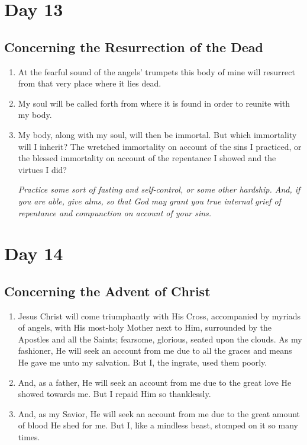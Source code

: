 \documentclass[11pt]{article}
\begin{document}
\section{Day 13}
\label{sec:org0da3211}
\subsection{Concerning the Resurrection of the Dead}
\label{sec:org780b55f}
\begin{enumerate}
\item At the fearful sound of the angels' trumpets this body of mine will resurrect from that very place where it lies dead.
\item My soul will be called forth from where it is found in order to reunite with my body.
\item My body, along with my soul, will then be immortal. But which immortality will I inherit? The wretched immortality on
account of the sins I practiced, or the blessed immortality on account of the repentance I showed and the virtues I did?

\emph{Practice some sort of fasting and self-control, or some other hardship. And, if you are able, give alms, so that God may grant you true internal}
\emph{grief of repentance and compunction on account of your sins.}
\end{enumerate}
\section{Day 14}
\label{sec:org672daeb}
\subsection{Concerning the Advent of Christ}
\label{sec:org398162e}
\begin{enumerate}
\item Jesus Christ will come triumphantly with His Cross, accompanied by myriads of angels, with His most-holy Mother next to Him, surrounded by the Apostles and all the Saints; fearsome, glorious, seated upon the clouds. As my fashioner, He will seek an account from me due to all the graces and means He gave me unto my salvation. But I, the ingrate, used them poorly.
\item And, as a father, He will seek an account from me due to the great love He showed towards me. But I repaid Him so thanklessly.
\item And, as my Savior, He will seek an account from me due to the great amount of blood He shed for me. But I, like a mindless beast, stomped on it so many times.
\end{enumerate}
\end{document}
